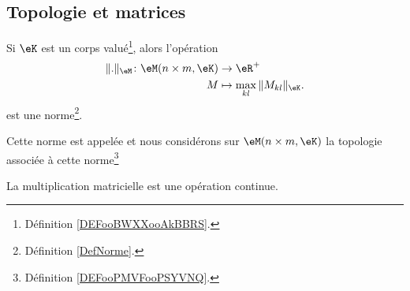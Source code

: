 \subsection{Topologie et matrices}

\begin{lemmaDef}      \label{DEFooCQHDooYpUAhG}
	Si \( \eK\) est un corps valué\footnote{Définition \ref{DEFooBWXXooAkBBRS}.}, alors l'opération
	\begin{equation}
		\begin{aligned}
			\| . \|_{\eM}\colon \eM(n\times m,\eK) & \to \eR^+                             \\
			M                                      & \mapsto  \max_{kl}\| M_{kl} \|_{\eK}.
		\end{aligned}
	\end{equation}
	est une norme\footnote{Définition \ref{DefNorme}.}.

	Cette norme est appelée  et nous considérons sur \( \eM(n\times m, \eK)\) la topologie associée à cette norme\footnote{Définition \ref{DEFooPMVFooPSYVNQ}.}
\end{lemmaDef}

\begin{proposition}     \label{PROPooOEETooPhqWuf}
	La multiplication matricielle est une opération continue.
\end{proposition}
